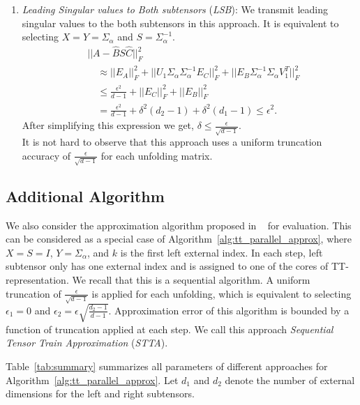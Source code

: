 \documentclass[sigconf]{acmart}
\newcommand{\hthird}{{\it LSB}\xspace}
\newcommand{\otta}{{\it STTA}\xspace}
\begin{document}
\begin{enumerate}
	\item \textit{Leading Singular values to Both subtensors} (\hthird): We transmit leading singular values to the both subtensors in this approach. It is equivalent to selecting $X=Y=\Sigma_\alpha$ and $S=\Sigma_\alpha^{-1}$.
	\begin{align*}
	&||A - \hat{B} S \hat{C}||_F^2\\
	&\quad\approx ||E_A||_F^2 + ||U_1\Sigma_\alpha \Sigma_\alpha^{-1} E_C||_F^2 + ||E_B \Sigma_\alpha^{-1} \Sigma_\alpha V_1^T||_F^2\\
	&\quad\le \frac{\epsilon^2}{d-1} + ||E_C||_F^2 + ||E_B||_F^2 \\
	&\quad= \frac{\epsilon^2}{d-1} + \delta^2 (d_2 -1) + \delta^2 (d_1-1) \le \epsilon^2.
	\end{align*}
	\noindent After simplifying this expression we get, $\delta \le \frac{\epsilon}{\sqrt{d-1}}$.\\
	It is not hard to observe that this approach uses a uniform truncation accuracy of $\frac{\epsilon}{\sqrt{d-1}}$ for each unfolding matrix.	
\end{enumerate}

\subsection{Additional Algorithm}
We also consider the approximation algorithm proposed in ~\cite{tt} for evaluation. This can be considered as a special case of Algorithm~\ref{alg:tt_parallel_approx}, where $X=S=I$, $Y=\Sigma_\alpha$, and $k$ is the first left external index. In each step, left subtensor only has one external index and is assigned to one of the cores of TT-representation. We recall that this is a sequential algorithm. A uniform truncation of $\frac{\epsilon}{\sqrt{d-1}}$ is applied for each unfolding, which is equivalent to selecting $\epsilon_1=0$ and $\epsilon_2=\epsilon\sqrt{\frac{d_2-1}{d-1}}$. Approximation error of this algorithm is bounded by a function of truncation applied at each step.
We call this approach \textit{Sequential Tensor Train Approximation} (\otta).

\medskip

Table~\ref{tab:summary} summarizes all parameters of different approaches for Algorithm~\ref{alg:tt_parallel_approx}. Let $d_1$ and $d_2$ denote the number of external dimensions for the left and right subtensors.
\end{document}
